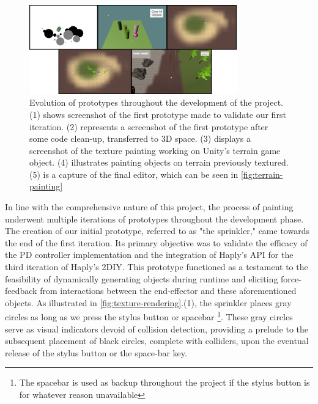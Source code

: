 \begin{figure}[htbp]
    \centering
    \includegraphics[width=0.8\textwidth]{images/timeline.png} 
    \caption{Evolution of prototypes throughout the development of the project.
    (1) shows screenshot of the first prototype made to validate our first iteration.
    (2) represents a screenshot of the first prototype after some code clean-up, transferred to 3D space.
    (3) displays a screenshot of the texture painting working on Unity's terrain game object.
    (4) illustrates painting objects on terrain previously textured.
    (5) is a capture of the final editor, which can be seen in \autoref{fig:terrain-painting}}
    \label{fig:evolution-painting}
\end{figure}

In line with the comprehensive nature of this project, the process of painting underwent multiple iterations of prototypes throughout the development phase.
The creation of our initial prototype, referred to as "the sprinkler," came towards the end of the first iteration. 
Its primary objective was to validate the efficacy of the PD controller implementation and the integration of Haply's API for the third iteration of Haply's 2DIY. 
This prototype functioned as a testament to the feasibility of dynamically generating objects during runtime and eliciting force-feedback from interactions between the end-effector and these aforementioned objects.
As illustrated in \autoref{fig:texture-rendering}.(1), the sprinkler places gray circles as long as we press the stylus button or spacebar \footnote{The spacebar is used as backup throughout the project if the stylus button is for whatever reason unavailable}.
These gray circles serve as visual indicators devoid of collision detection, providing a prelude to the subsequent placement of black circles, complete with colliders, upon the eventual release of the stylus button or the space-bar key.

